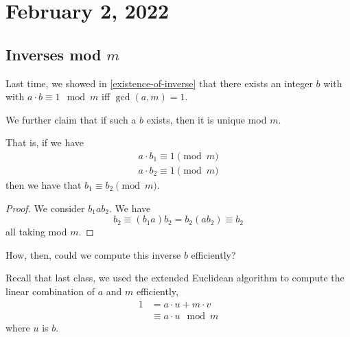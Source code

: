 \section{February 2, 2022}
\subsection{Inverses mod \texorpdfstring{$m$}{m}}
\recall Last time, we showed in \cref{existence-of-inverse} that there exists an integer $b$ with with $a\cdot b\equiv 1\mod m$ iff $\gcd(a, m) = 1$.

\begin{claim}
    We further claim that if such a $b$ exists, then it is unique mod $m$.

    That is, if we have
    \begin{align*}
        a\cdot b_1\equiv 1\pmod{m} \\
        a\cdot b_2\equiv 1\pmod{m}
    \end{align*}
    then we have that $b_1\equiv b_2\pmod{m}$.
\end{claim}
\begin{proof}
    We consider $b_1 ab_2$. We have
    \[b_2\equiv (b_1 a)b_2 = b_2(a b_2) \equiv b_2\]
    all taking mod $m$.
\end{proof}

How, then, could we compute this inverse $b$ efficiently?

Recall that last class, we used the extended Euclidean algorithm to compute the linear combination of $a$ and $m$ efficiently,
\begin{align*}
    1 & = a\cdot u + m\cdot v          \\
      & \equiv a\cdot \boxed{u}\mod{m}
\end{align*}
where $u$ is $b$.

